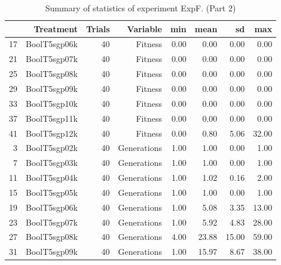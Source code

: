 \begin{table}[ht]
\centering
\begin{tabular}{rrrrrrrr}
  \hline
 & Treatment & Trials & Variable & min & mean & sd & max \\ 
  \hline
17 & BoolT5sgp06k &  40 & Fitness & 0.00 & 0.00 & 0.00 & 0.00 \\ 
  21 & BoolT5sgp07k &  40 & Fitness & 0.00 & 0.00 & 0.00 & 0.00 \\ 
  25 & BoolT5sgp08k &  40 & Fitness & 0.00 & 0.00 & 0.00 & 0.00 \\ 
  29 & BoolT5sgp09k &  40 & Fitness & 0.00 & 0.00 & 0.00 & 0.00 \\ 
  33 & BoolT5sgp10k &  40 & Fitness & 0.00 & 0.00 & 0.00 & 0.00 \\ 
  37 & BoolT5sgp11k &  40 & Fitness & 0.00 & 0.00 & 0.00 & 0.00 \\ 
  41 & BoolT5sgp12k &  40 & Fitness & 0.00 & 0.80 & 5.06 & 32.00 \\ 
  3 & BoolT5sgp02k &  40 & Generations & 1.00 & 1.00 & 0.00 & 1.00 \\ 
  7 & BoolT5sgp03k &  40 & Generations & 1.00 & 1.00 & 0.00 & 1.00 \\ 
  11 & BoolT5sgp04k &  40 & Generations & 1.00 & 1.02 & 0.16 & 2.00 \\ 
  15 & BoolT5sgp05k &  40 & Generations & 1.00 & 1.00 & 0.00 & 1.00 \\ 
  19 & BoolT5sgp06k &  40 & Generations & 1.00 & 5.08 & 3.35 & 13.00 \\ 
  23 & BoolT5sgp07k &  40 & Generations & 1.00 & 5.92 & 4.83 & 28.00 \\ 
  27 & BoolT5sgp08k &  40 & Generations & 4.00 & 23.88 & 15.00 & 59.00 \\ 
  31 & BoolT5sgp09k &  40 & Generations & 1.00 & 15.97 & 8.67 & 38.00 \\ 
   \hline
\end{tabular}
\caption{Summary of statistics of experiment ExpF. (Part 2)} 
\end{table}
